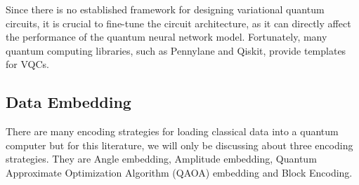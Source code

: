 Since there is no established framework for designing variational
quantum circuits, it is crucial to fine-tune the circuit
architecture, as it can directly affect the performance of the
quantum neural network model. Fortunately, many quantum computing
libraries, such as Pennylane and Qiskit, provide templates for
\glspl{VQC}.

\subsection{Data Embedding}
\label{subsec:data_embedding}
There are many encoding strategies for loading classical data into a
quantum computer but for this literature, we will only be discussing
about three encoding strategies. They are Angle embedding, Amplitude
embedding, Quantum Approximate Optimization Algorithm (QAOA)
embedding and Block Encoding.

